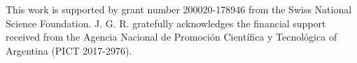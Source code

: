 \documentclass[draft]{agujournal2019}
\begin{document}
%
%
%
%
%
%
%
%

\acknowledgments
This work is supported by grant number 200020-178946 from the Swiss National Science Foundation. J. G. R. gratefully acknowledges the financial support received from the Agencia Nacional de Promoción Científica y Tecnológica of Argentina (PICT 2017-2976).

%
%







%
%
%
%
%
\end{document}
